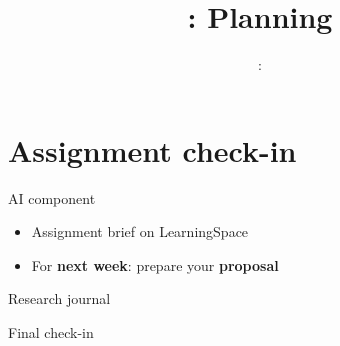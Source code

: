 \usepackage{../../beamerthemeFalmouthGamesAcademy}
\usepackage{multimedia}
\graphicspath{ {../../} }


\usepackage[normalem]{ulem}
\usepackage{wasysym}

\usepackage{pdfpages}

\usetikzlibrary{arrows,automata}

\usepackage{qtree}
\usepackage{algorithm}
\usepackage{algpseudocode}




\title{\sessionnumber: Planning}
\subtitle{\modulecode: \moduletitle}

\frame{\titlepage} 




\part{Assignment check-in}
\frame{\partpage}

\begin{frame}{AI component}
    \begin{itemize}
        \item Assignment brief on LearningSpace
        \item For \textbf{next week}: prepare your \textbf{proposal}
    \end{itemize}
\end{frame}

\begin{frame}{Research journal}
    \begin{center}
        Final check-in
    \end{center}
\end{frame}


